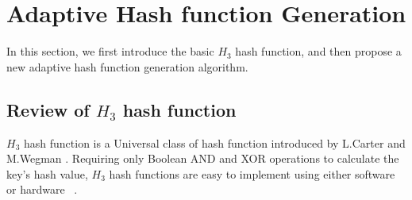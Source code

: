 \documentclass[10pt,journal,letterpaper]{IEEEtran}
\newcommand{\note}[1]{{\sffamily\itshape\bfseries\uline{#1}}}
\begin{document}
%
%



\section{Adaptive Hash function Generation}
\label{sec:Adaptive Hash function Generation}
In this section,
we first  introduce the basic $H_3$ hash function, and then propose a new adaptive hash function generation algorithm.


\subsection{Review of $H_3$ hash function}
\label{subsec:The review of $H_3$ hash function}
$H_3$ hash function is a Universal class of hash function introduced by L.Carter and M.Wegman \cite{carter1979universal}.
 Requiring only Boolean AND and XOR operations to calculate the key's hash value, $H_3$ hash functions are easy to implement using either software or hardware ~\cite{ramakrishna1997efficient,ramakrishna1991perfect}.
\end{document}
